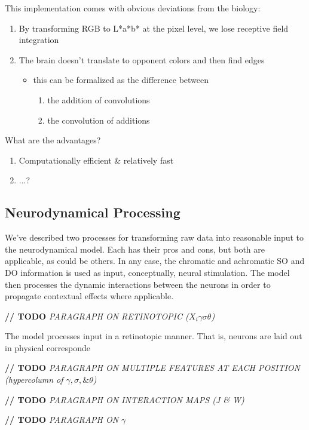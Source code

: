\documentclass[journal,onecolumn]{IEEEtran}
\begin{document}
This implementation comes with obvious deviations from the biology:
\begin{enumerate}
    \item By transforming RGB to L*a*b* at the pixel level, we lose receptive field integration
    \item The brain doesn't translate to opponent colors and then find edges
    \begin{itemize}
        \item this can be formalized as the difference between
        \begin{enumerate}
            \item the addition of convolutions
            \item the convolution of additions
        \end{enumerate}
    \end{itemize}
\end{enumerate}

What are the advantages?
\begin{enumerate}
    \item Computationally efficient \& relatively fast
    \item ...?
\end{enumerate}


\subsection*{Neurodynamical Processing}

We've described two processes for transforming raw data into reasonable input to the neurodynamical model. Each has their pros and cons, but both are applicable, as could be others. In any case, the chromatic and achromatic SO and DO information is used as input, conceptually, neural stimulation. The model then processes the dynamic interactions between the neurons in order to propagate contextual effects where applicable.

\textbf{// TODO} \textit{PARAGRAPH ON RETINOTOPIC ($X_{i}\gamma\sigma\theta$)}

The model processes input in a retinotopic manner. That is, neurons are laid out in physical corresponde

\textbf{// TODO} \textit{PARAGRAPH ON MULTIPLE FEATURES AT EACH POSITION (hypercolumn of $\gamma, \sigma, \& \theta$)}

\textbf{// TODO} \textit{PARAGRAPH ON INTERACTION MAPS (J \& W)}

\textbf{// TODO} \textit{PARAGRAPH ON $\gamma$}
\end{document}
